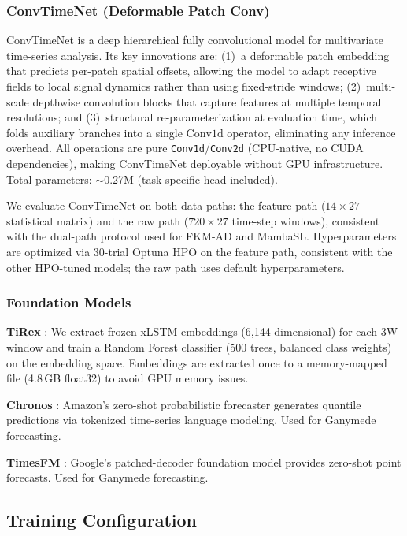 \documentclass[conference]{IEEEtran}
\begin{document}
\subsubsection{ConvTimeNet (Deformable Patch Conv)}

ConvTimeNet \cite{convtimenet} is a deep hierarchical fully convolutional model for multivariate time-series analysis. Its key innovations are: (1)~a deformable patch embedding that predicts per-patch spatial offsets, allowing the model to adapt receptive fields to local signal dynamics rather than using fixed-stride windows; (2)~multi-scale depthwise convolution blocks that capture features at multiple temporal resolutions; and (3)~structural re-parameterization at evaluation time, which folds auxiliary branches into a single $\text{Conv1d}$ operator, eliminating any inference overhead. All operations are pure \texttt{Conv1d}/\texttt{Conv2d} (CPU-native, no CUDA dependencies), making ConvTimeNet deployable without GPU infrastructure. Total parameters: $\sim$0.27M (task-specific head included).

We evaluate ConvTimeNet on both data paths: the feature path ($14 \times 27$ statistical matrix) and the raw path ($720 \times 27$ time-step windows), consistent with the dual-path protocol used for FKM-AD and MambaSL. Hyperparameters are optimized via 30-trial Optuna HPO on the feature path, consistent with the other HPO-tuned models; the raw path uses default hyperparameters.

\subsubsection{Foundation Models}

\textbf{TiRex} \cite{tirex}: We extract frozen xLSTM embeddings (6{,}144-dimensional) for each 3W window and train a Random Forest classifier (500 trees, balanced class weights) on the embedding space. Embeddings are extracted once to a memory-mapped file (4.8\,GB float32) to avoid GPU memory issues.

\textbf{Chronos} \cite{chronos}: Amazon's zero-shot probabilistic forecaster generates quantile predictions via tokenized time-series language modeling. Used for Ganymede forecasting.

\textbf{TimesFM} \cite{timesfm}: Google's patched-decoder foundation model provides zero-shot point forecasts. Used for Ganymede forecasting.

\subsection{Training Configuration}
\end{document}
